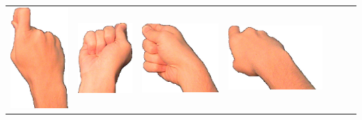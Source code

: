 \documentclass{article}
\begin{document}
\begin{center}
\begin{tabular}{r*{6}{c}}
\includegraphics[scale=0.1]{images/09-06-3.jpg}&
\includegraphics[scale=0.1]{images/09-06-4.jpg}&
\includegraphics[scale=0.1]{images/09-06-5.jpg}&
\includegraphics[scale=0.1]{images/09-06-6.jpg}\\

\end{tabular}
\end{center}
\end{document}
